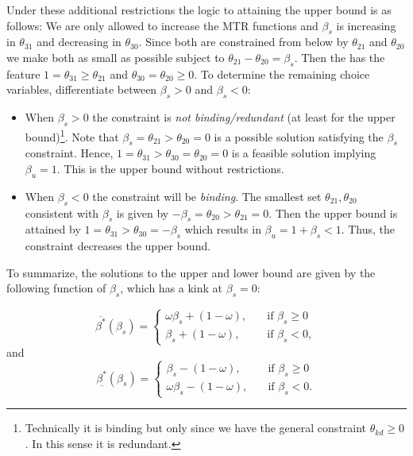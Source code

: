 \documentclass[11pt,a4paper,english]{article} %
\numberwithin{equation}{section}
\numberwithin{figure}{section}
\numberwithin{table}{section}
\theoremstyle{definition}
\theoremstyle{remark}
\begin{document}
Under these additional restrictions the logic to attaining the upper bound is as follows:
We are only allowed to increase the MTR functions and $\beta_s$ is increasing in $\theta_{31}$ and decreasing in $\theta_{30}$.
Since both are constrained from below by $\theta_{21}$ and $\theta_{20}$ we make both as small as possible subject to $\theta_{21} - \theta_{20} = \beta_s$.
Then the has the feature $1 = \theta_{31} \geq \theta_{21}$ and $\theta_{30} = \theta_{20} \geq 0$.
To determine the remaining choice variables, differentiate between $\beta_s > 0$ and $\beta_s < 0$:
\begin{itemize}
	\item When $\beta_s > 0$ the constraint is \textit{not binding/redundant} (at least for the upper bound)\footnote{Technically it is binding but only since we have the general constraint $\theta_{kd} \geq 0$. In this sense it is redundant.}. Note that $\beta_s = \theta_{21} > \theta_{20} = 0$ is a possible solution satisfying the $\beta_s$ constraint.
	Hence, $1 = \theta_{31} > \theta_{30} = \theta_{20} = 0$ is a feasible solution implying $\beta_u = 1$. This is the upper bound without restrictions.
	\item When $\beta_s < 0$ the constraint will be \textit{binding}. The smallest set $\theta_{21}, \theta_{20}$ consistent with $\beta_s$ is given by $-\beta_s = \theta_{20} > \theta_{21} = 0$.
	Then the upper bound is attained by $1 = \theta_{31} > \theta_{30} = -\beta_s$ which results in $\beta_u = 1 + \beta_s < 1$. Thus, the constraint decreases the upper bound.
\end{itemize}

To summarize, the solutions to the upper and lower bound are given by the following function of $\beta_s$, which has a kink at $\beta_s = 0$:

\begin{equation}
	\overline{\beta^*}(\beta_s)=
	\begin{cases}
		\omega \beta_s + (1 - \omega),& \quad \text{if } \beta_s \geq 0\\
		\beta_s + (1 - \omega),              & \quad \text{if } \beta_s < 0,
	\end{cases}
\end{equation}
and
\begin{equation}
	\underline{\beta^*}(\beta_s)=
	\begin{cases}
		\beta_s - (1 - \omega),& \quad \text{if } \beta_s \geq 0\\
		\omega \beta_s - (1 - \omega),              & \quad \text{if } \beta_s < 0.
	\end{cases}
\end{equation}
\end{document}
